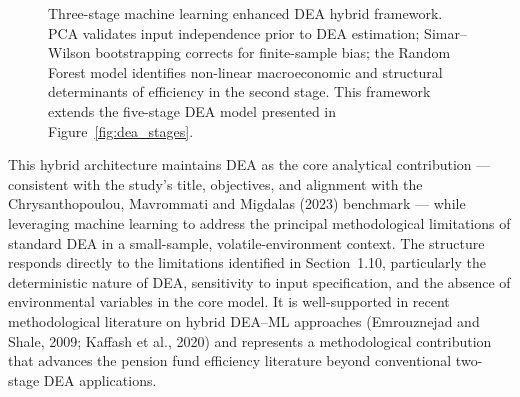 \documentclass[12pt,a4paper]{article}
\begin{document}
\begin{figure}[H]
\centering
{}
\caption{Three-stage machine learning enhanced DEA hybrid framework. PCA validates input independence prior to DEA estimation; Simar--Wilson bootstrapping corrects for finite-sample bias; the Random Forest model identifies non-linear macroeconomic and structural determinants of efficiency in the second stage. This framework extends the five-stage DEA model presented in Figure~\ref{fig:dea_stages}.}
\label{fig:ml_hybrid}
\end{figure}

This hybrid architecture maintains DEA as the core analytical contribution --- consistent with the study's title, objectives, and alignment with the Chrysanthopoulou, Mavrommati and Migdalas (2023) benchmark --- while leveraging machine learning to address the principal methodological limitations of standard DEA in a small-sample, volatile-environment context. The structure responds directly to the limitations identified in Section~1.10, particularly the deterministic nature of DEA, sensitivity to input specification, and the absence of environmental variables in the core model. It is well-supported in recent methodological literature on hybrid DEA--ML approaches (Emrouznejad and Shale, 2009; Kaffash et al., 2020) and represents a methodological contribution that advances the pension fund efficiency literature beyond conventional two-stage DEA applications.
\end{document}
